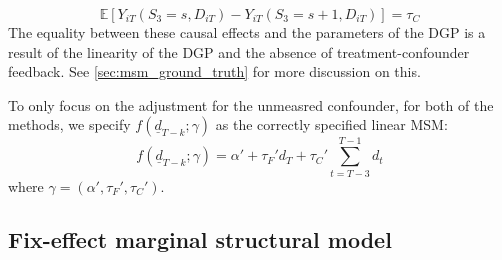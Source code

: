 \begin{equation}
    \mathbb{E}\left[Y_{iT}\left({S_3 = s, D_{iT}}\right) - Y_{iT}\left({S_3 = s+1, D_{iT}}\right)\right] = \tau_C
\end{equation}
The equality between these causal effects and the parameters of the DGP is a result of the linearity of the DGP and the absence of treatment-confounder feedback. 
See \ref{sec:msm_ground_truth} for more discussion on this.

To only focus on the adjustment for the unmeasred confounder, for both of the methods, 
we specify $f\left(\underline{d}_{T-k}; \gamma \right)$ as the correctly specified linear MSM:
\begin{equation}
    f\left(\underline{d}_{T-k}; \gamma \right) = \alpha' + \tau_F' d_T + \tau_C' \sum_{t=T-3}^{T-1} d_t
\end{equation}
where $\gamma = (\alpha', \tau_F', \tau_C')$. 
\subsection{Fix-effect marginal structural model}





 
 



